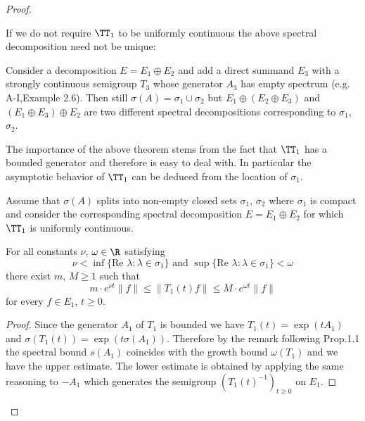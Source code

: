 \begin{proof}
\newpage
\begin{example}\label{ex:a3-3.4}

If we do not require $\TT_{1}$ to be uniformly continuous the above spectral decomposition need not be unique:

Consider a decomposition $E = E_{1} \oplus E_{2}$ and add a direct summand $E_{3}$ with a strongly continuous semigroup $T_{3}$ whose generator $A_{3}$ has empty spectrum (e.g. A-I,Example 2.6).
Then still $\sigma(A) = \sigma_{1} \cup \sigma_{2}$ but $E_{1} \oplus (E_{2} \oplus E_{3})$ and $(E_{1} \oplus E_{3}) \oplus E_{2}$ are two different spectral decompositions corresponding to $\sigma_{1}$, $\sigma_{2}$.
\end{example}

The importance of the above theorem stems from the fact that $\TT_{1}$ has a bounded generator and therefore is easy to deal with.
In particular the asymptotic behavior of $\TT_{1}$ can be deduced from the location of $\sigma_{1}$.

\begin{corollary}\label{cor:a3-3.4}

Assume that $\sigma(A)$ splits into non-empty closed sets $\sigma_{1}$, $\sigma_{2}$ where $\sigma_{1}$ is compact and consider the corresponding spectral decomposition $E = E_{1} \oplus E_{2}$ for which $\TT_{1}$ is uniformly continuous.

For all constants $\nu$, $\omega \in \R$ satisfying
\[
\nu < \inf \{\text{Re }\lambda \colon \lambda \in \sigma_{1}\} \text{ and } \sup \{\text{Re }\lambda \colon \lambda \in \sigma_{1}\} < \omega
\]
there exist $m$, $M \geq 1$ such that
\[
m \cdot e^{\nu t}\|f\| \leq \|T_{1}(t)f\| \leq M \cdot e^{\omega t}\|f\|
\]
for every $f \in E_{1}$, $t \geq 0$.
\end{corollary}

\begin{proof}
Since the generator $A_{1}$ of $T_{1}$ is bounded we have $T_{1}(t) = \exp(tA_{1})$ and $\sigma(T_{1}(t)) = \exp(t\sigma(A_{1}))$.
Therefore by the remark following Prop.1.1 the spectral bound $s(A_{1})$ coincides with the growth bound $\omega(T_{1})$ and we have the upper estimate.
The lower estimate is obtained by applying the same reasoning to $-A_{1}$ which generates the semigroup $(T_{1}(t)^{-1})_{t \geq 0}$ on $E_{1}$.
\end{proof}


\end{proof}
